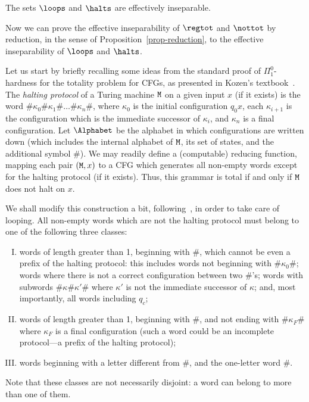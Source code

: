 \documentclass[runningheads]{amsart}
\newcommand{\TM}{\text{\rm\tt M}}
\begin{document}
\begin{proposition}\label{prop-insepCH}
The sets $\loops$ and $\halts$ are effectively inseparable.
\end{proposition}

Now we can prove the effective inseparability of $\regtot$ and $\nottot$ by reduction, in the sense of Proposition~\ref{prop-reduction}, to the effective inseparability of $\loops$ and $\halts$.


Let us start by briefly recalling some ideas from the standard proof of $\Pi^0_1$-hardness for the totality problem for CFGs, as presented in Kozen's textbook~\cite{Kozen1997}. 
The {\em halting protocol} of a Turing machine $\TM$ on a given input $x$ (if it exists) is the word $\# \kappa_0 \# \kappa_1 \# \ldots \# \kappa_n \#$, where $\kappa_0$ is the initial configuration $q_0 x$, each $\kappa_{i+1}$ is the configuration which is the immediate successor of $\kappa_i$, and $\kappa_n$ is a final configuration. Let $\Alphabet$ be the alphabet in which configurations are written down (which includes the internal alphabet of $\TM$, its set of states, and the additional symbol $\#$).
We may readily define a (computable) {reducing function}, mapping each pair $(\TM,x)$ to a CFG which generates all non-empty words except for the halting protocol (if it exists). Thus, this grammar is total if and only if $\TM$ does not halt on $x$. 



We shall modify this construction a bit, following~\cite{Kuznetsov2021TOCL}, in order to take care of looping. 
All non-empty words which are not the halting protocol must belong to one of the following three classes:%
\begin{enumerate}[(I)]
\item\label{not-prefix-haltprot} words of length greater than 1, beginning with $\#$, which cannot be even a prefix of the halting protocol: this includes words not beginning with $\# \kappa_0 \#$; words where there is not a correct configuration between two $\#$'s; words with subwords $\# \kappa \# \kappa' \#$ where $\kappa'$ is not the immediate successor of $\kappa$; and, most importantly, all words including $q_c$;
\item\label{incomplete-prot} words of length greater than 1, beginning with $\#$, and not ending with $\# \kappa_F \#$ where $\kappa_F$ is a final configuration (such a word could be an incomplete protocol---a prefix of the halting protocol);
\item\label{begins-incorrectly} words beginning with a letter different from $\#$, and the one-letter word $\#$.
\end{enumerate}
Note that these classes are not necessarily disjoint: a word can belong to more than one of them.
\end{document}
